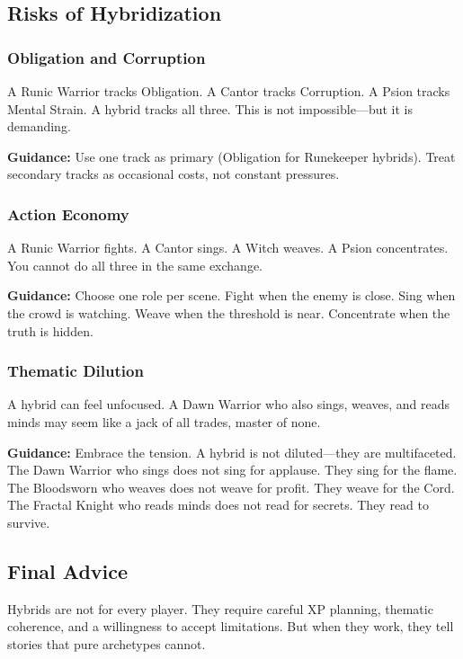\subsection{Risks of Hybridization}

\subsubsection{Obligation and Corruption}

A Runic Warrior tracks Obligation. A Cantor tracks Corruption. A Psion tracks Mental Strain. A hybrid tracks all three. This is not impossible—but it is demanding.

\textbf{Guidance:} Use one track as primary (Obligation for Runekeeper hybrids). Treat secondary tracks as occasional costs, not constant pressures.

\subsubsection{Action Economy}

A Runic Warrior fights. A Cantor sings. A Witch weaves. A Psion concentrates. You cannot do all three in the same exchange.

\textbf{Guidance:} Choose one role per scene. Fight when the enemy is close. Sing when the crowd is watching. Weave when the threshold is near. Concentrate when the truth is hidden.

\subsubsection{Thematic Dilution}

A hybrid can feel unfocused. A Dawn Warrior who also sings, weaves, and reads minds may seem like a jack of all trades, master of none.

\textbf{Guidance:} Embrace the tension. A hybrid is not diluted—they are multifaceted. The Dawn Warrior who sings does not sing for applause. They sing for the flame. The Bloodsworn who weaves does not weave for profit. They weave for the Cord. The Fractal Knight who reads minds does not read for secrets. They read to survive.

\subsection{Final Advice}

Hybrids are not for every player. They require careful XP planning, thematic coherence, and a willingness to accept limitations. But when they work, they tell stories that pure archetypes cannot.

